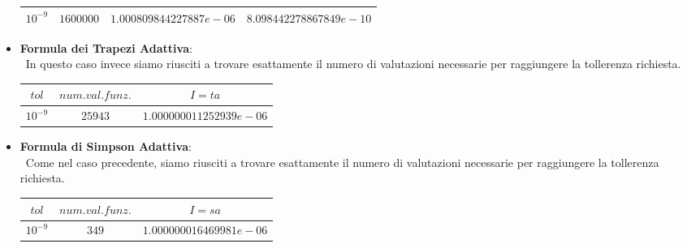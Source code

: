 \begin{itemize}
\begin{center}
\begin{tabular}{|c|c|c|c|}
						$10^{-9}$ & $1600000$ & $1.000809844227887e-06$ & $8.098442278867849e-10$ \\
					\hline
			\end{tabular}
			\end{center}
	\item
		\textbf{Formula dei Trapezi Adattiva}:\\\
			In questo caso invece siamo riusciti a trovare esattamente il numero di valutazioni necessarie per raggiungere la tollerenza richiesta.
			\begin{center}
			\begin{tabular}{|c|c|c|}
				\hline
					$tol$ & $num. val. funz.$ & $I=ta$ \\
    				\hline
    					$10^{-9}$ & $25943$ & $1.000000011252939e-06$ \\
				\hline
			\end{tabular}
			\end{center}
	\item
		\textbf{Formula di Simpson Adattiva}:\\\
			Come nel caso precedente, siamo riusciti a trovare esattamente il numero di valutazioni necessarie per raggiungere la tollerenza richiesta.
			\begin{center}
			\begin{tabular}{|c|c|c|}
				\hline
					$tol$ & $num. val. funz.$ & $I=sa$ \\
    				\hline
    					$10^{-9}$ & $349$ & $1.000000016469981e-06$ \\
					\hline
			\end{tabular}
			\end{center}
\end{itemize}